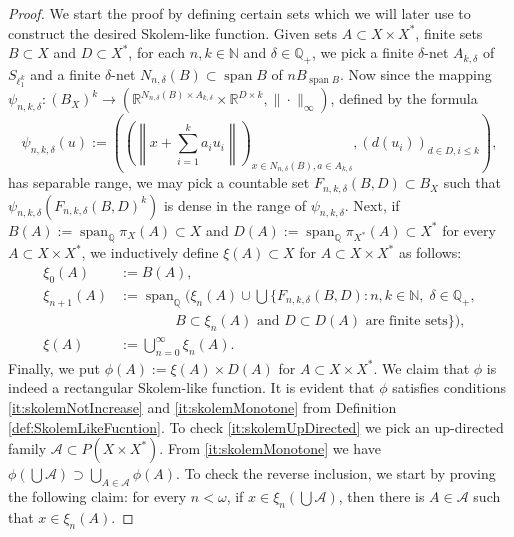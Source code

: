 \documentclass[11pt]{amsart}
\theoremstyle{definition}
\theoremstyle{remark}
\newcommand{\Nat}{\mathbb N}
\newcommand{\Rat}{\mathbb Q}
\newcommand{\Span}{\operatorname{span}}
\begin{document}
\begin{proof}We start the proof by defining certain sets which we will later use to construct the desired Skolem-like function. Given sets $A\subset X\times X^*$, finite sets $B\subset X$ and $D\subset X^*$, for each $n,k \in \Nat$ and $\delta\in \Rat_+$, we pick a finite $\delta$-net $A_{k,\delta}$ of $S_{\ell_1^k}$ and a finite $\delta$-net $N_{n,\delta}(B)\subset \Span B$ of $nB_{\Span B}$. Now since the mapping $\psi_{n,k,\delta}: (B_X)^{k} \to  (\mathbb{R}^{N_{n,\delta}(B) \times A_{k,\delta}} \times \mathbb{R}^{D \times k},\|\cdot\|_\infty)$, defined by the formula
\[
		\psi_{n,k,\delta}(u) := \left(\left(\left\|x + \sum_{i=1}^{k} a_iu_i \right\|\right)_{x\in N_{n,\delta}(B),a\in A_{k,\delta}},\left(d(u_i)\right)_{d\in D, i\leq k}\right),
\]
has separable range, we may pick a countable set $F_{n,k,\delta}(B,D)\subset B_X$ such that $\psi_{n,k,\delta}(F_{n,k,\delta}(B,D)^k)$ is dense in the range of $\psi_{n,k,\delta}$.
Next, if $B(A):=\Span_\Rat \pi_X(A)\subset X$ and $D(A):=\Span_\Rat \pi_{X^*}(A)\subset X^*$ for every $A\subset X\times X^*$, we inductively define $\xi(A)\subset X$ for $A\subset X\times X^*$ as follows:
\[\begin{split}
\xi_0(A)&:=B(A),\\
\xi_{n+1}(A)&:=\Span_\Rat\Big(\xi_n(A)\cup \bigcup \Big\{F_{n,k,\delta}(B,D)\colon n,k\in\Nat,\; \delta\in\Rat_+,\\
&\qquad\qquad B\subset \xi_n(A) \text{ and } D\subset D(A) \text{ are finite sets}\Big\}\Big),\\
\xi(A)&:=\bigcup_{n=0}^\infty \xi_n(A).
\end{split}\]
Finally, we put $\phi(A):=\xi(A)\times D(A)$ for $A\subset X\times X^*$. We claim that $\phi$ is indeed a rectangular Skolem-like function. It is evident that $\phi$ satisfies conditions \ref{it:skolemNotIncrease} and \ref{it:skolemMonotone} from Definition \ref{def:SkolemLikeFucntion}. To check \ref{it:skolemUpDirected} we pick an up-directed family $\mathcal{A}\subset P(X\times X^*)$. From \ref{it:skolemMonotone} we have $\phi(\bigcup \mathcal{A})\supset \bigcup_{A\in \mathcal{A}}\phi(A)$. To check the reverse inclusion, we start by proving the following claim: for every $n<\omega$, if $x\in \xi_n(\bigcup \mathcal{A})$, then there is $A\in \mathcal{A}$ such that $x\in \xi_n(A)$.


\end{proof}
\end{document}
